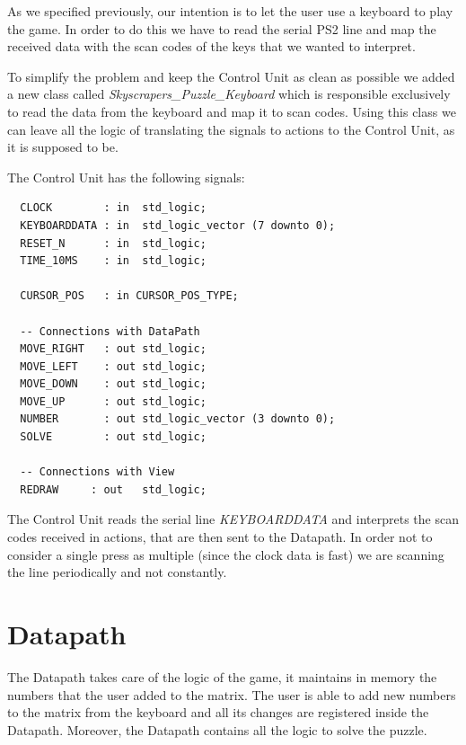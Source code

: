 \documentclass[12pt]{report}
\begin{document}
As we specified previously, our intention is to let the user use
a keyboard to play the game. In order to do this we have to read the
serial PS2 line and map the received data with the scan codes of the
keys that we wanted to interpret.

To simplify the problem and keep the Control Unit as clean as possible
we added a new class called \textit{Skyscrapers\_Puzzle\_Keyboard} which is
responsible exclusively to read the data from the keyboard and map it to
scan codes. Using this class we can leave all the logic of translating
the signals to actions to the Control Unit, as it is supposed to be.

The Control Unit has the following signals:

\begin{center}
\begin{minipage}{0.5\textwidth}
\begin{verbatim}
  CLOCK        : in  std_logic;
  KEYBOARDDATA : in  std_logic_vector (7 downto 0);
  RESET_N      : in  std_logic;
  TIME_10MS    : in  std_logic;

  CURSOR_POS   : in CURSOR_POS_TYPE;

  -- Connections with DataPath
  MOVE_RIGHT   : out std_logic;
  MOVE_LEFT    : out std_logic;
  MOVE_DOWN    : out std_logic;
  MOVE_UP      : out std_logic;
  NUMBER       : out std_logic_vector (3 downto 0);
  SOLVE        : out std_logic;

  -- Connections with View
  REDRAW     : out   std_logic;
\end{verbatim}
\end{minipage}
\end{center}

The Control Unit reads the serial line \textit{KEYBOARDDATA} and
interprets the scan codes received in actions, that are then sent to the
Datapath. In order not to consider a single press as multiple (since the
clock data is fast) we are scanning the line periodically and not
constantly.

\newpage

\section*{Datapath}

The Datapath takes care of the logic of the game, it maintains in memory
the numbers that the user added to the matrix. The user is able to add new
numbers to the matrix from the keyboard and all its changes are registered
inside the Datapath. Moreover, the Datapath contains all the logic to
solve the puzzle.
\end{document}
